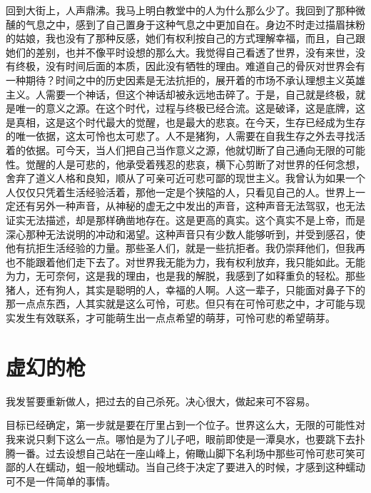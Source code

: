 \documentclass[12pt,oneside]{book}
\begin{document}
回到大街上，人声鼎沸。我马上明白教堂中的人为什么那么少了。我回到了那种微醺的气息之中，感到了自己置身于这种气息之中更加自在。身边不时走过描眉抹粉的姑娘，我也没有了那种反感，她们有权利按自己的方式理解幸福，而且，自己跟她们的差别，也并不像平时设想的那么大。我觉得自己看透了世界，没有来世，没有终极，没有时间后面的本质，因此没有牺牲的理由。难道自己的骨灰对世界会有一种期待？时间之中的历史因素是无法抗拒的，展开着的市场不承认理想主义英雄主义。人需要一个神话，但这个神话却被永远地击碎了。于是，自己就是终极，就是唯一的意义之源。在这个时代，过程与终极已经合流。这是破译，这是底牌，这是真相，这是这个时代最大的觉醒，也是最大的悲哀。在今天，生存已经成为生存的唯一依据，这太可怜也太可悲了。人不是猪狗，人需要在自我生存之外去寻找活着的依据。可今天，当人们把自己当作意义之源，他就切断了自己通向无限的可能性。觉醒的人是可悲的，他承受着残忍的悲哀，横下心剪断了对世界的任何念想，舍弃了道义人格和良知，顺从了可亲可近可悲可鄙的现世主义。我曾认为如果一个人仅仅只凭着生活经验活着，那他一定是个狭隘的人，只看见自己的人。世界上一定还有另外一种声音，从神秘的虚无之中发出的声音，这种声音无法驾驭，也无法证实无法描述，却是那样确凿地存在。这是更高的真实。这个真实不是上帝，而是深心那种无法说明的冲动和渴望。这种声音只有少数人能够听到，并受到感召，使他有抗拒生活经验的力量。那些圣人们，就是一些抗拒者。我仍崇拜他们，但我再也不能跟着他们走下去了。对世界我无能为力，我有权利放弃，我只能如此。无能为力，无可奈何，这是我的理由，也是我的解脱，我感到了如释重负的轻松。那些猪人，还有狗人，其实是聪明的人，幸福的人啊。人这一辈子，只能面对鼻子下的那一点点东西，人其实就是这么可怜，可悲。但只有在可怜可悲之中，才可能与现实发生有效联系，才可能萌生出一点点希望的萌芽，可怜可悲的希望萌芽。


\chapter{虚幻的枪}

我发誓要重新做人，把过去的自己杀死。决心很大，做起来可不容易。

目标已经确定，第一步就是要在厅里占到一个位子。世界这么大，无限的可能性对我来说只剩下这么一点。哪怕是为了儿子吧，眼前即使是一潭臭水，也要跳下去扑腾一番。过去设想自己站在一座山峰上，俯瞰山脚下名利场中那些可怜可悲可笑可鄙的人在蠕动，蛆一般地蠕动。当自己终于决定了要进入的时候，才感到这种蠕动可不是一件简单的事情。
\end{document}
